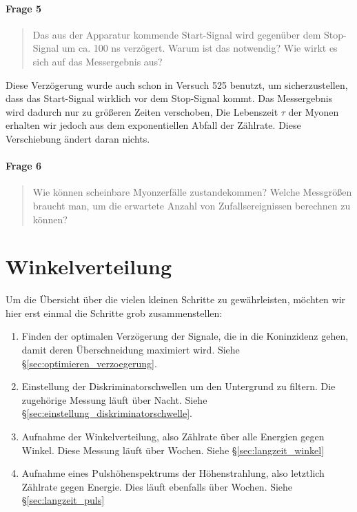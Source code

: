 \documentclass[11pt, ngerman, fleqn, DIV=15, headinclude, BCOR=2cm]{scrreprt}
\begin{document}
\subsubsection{Frage 5}

\begin{quote}
    Das aus der Apparatur kommende Start-Signal wird gegenüber dem Stop-Signal
    um ca. 100 ns verzögert. Warum ist das notwendig? Wie wirkt es sich auf das
    Messergebnis aus?
\end{quote}

Diese Verzögerung wurde auch schon in Versuch 525 benutzt, um sicherzustellen,
dass das Start-Signal wirklich vor dem Stop-Signal kommt. Das Messergebnis wird
dadurch nur zu größeren Zeiten verschoben, Die Lebenszeit $\tau$ der Myonen
erhalten wir jedoch aus dem exponentiellen Abfall der Zählrate. Diese
Verschiebung ändert daran nichts.

\subsubsection{Frage 6}

\begin{quote}
    Wie können scheinbare Myonzerfälle zustandekommen? Welche Messgrößen
    braucht man, um die erwartete Anzahl von Zufallsereignissen berechnen zu
    können?
\end{quote}


\chapter{Winkelverteilung}

Um die Übersicht über die vielen kleinen Schritte zu gewährleisten, möchten wir
hier erst einmal die Schritte grob zusammenstellen:

\begin{enumerate}
    \item
        Finden der optimalen Verzögerung der Signale, die in die Koninzidenz
        gehen, damit deren Überschneidung maximiert wird. Siehe
        §\ref{sec:optimieren_verzoegerung}.

    \item
        Einstellung der Diskriminatorschwellen um den Untergrund zu filtern.
        Die zugehörige Messung läuft über Nacht. Siehe
        §\ref{sec:einstellung_diskriminatorschwelle}.

    \item
        Aufnahme der Winkelverteilung, also Zählrate über alle Energien gegen
        Winkel. Diese Messung läuft über Wochen. Siehe
        §\ref{sec:langzeit_winkel}

    \item
        Aufnahme eines Pulshöhenspektrums der Höhenstrahlung, also letztlich
        Zählrate gegen Energie. Dies läuft ebenfalls über Wochen. Siehe
        §\ref{sec:langzeit_puls}
\end{enumerate}
\end{document}
